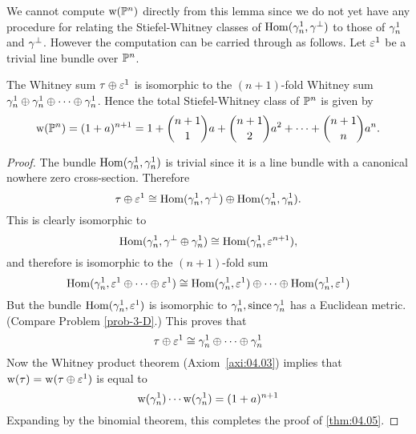 \documentclass[../main]{subfiles}
\begin{document}
We cannot compute $\operatorname{w}(\mathbb{P}^n)$ directly from this lemma since we do not yet have any procedure for relating the Stiefel-Whitney classes of $\operatorname{Hom}(\gamma_n^1, \gamma^{\perp})$ to those of $\gamma_n^1$ and $\gamma^{\perp}$. However the computation can be carried through as follows. Let $\varepsilon^1$ be a trivial line bundle over $\mathbb{P}^{n}$.

\begin{theorem}
\label{thm:04.05}
The Whitney sum $\tau \oplus \varepsilon^{1}$ is isomorphic to the $(n+1)$-fold Whitney sum $\gamma_{n}^{1} \oplus \gamma_{n}^{1} \oplus \cdots \oplus \gamma_{n}^{1}$. Hence the total Stiefel-Whitney class of $\mathbb{P}^{n}$ is given by
\[
\operatorname{w}(\mathbb{P}^{n})=(1+a)^{n+1}=1+\binom{n+1}{1}a + \binom{n+1}{2}a^2 + \dots + \binom{n+1}{n}a^{n} .
\]
\end{theorem}

\begin{proof}
The bundle $\operatorname{Hom}(\gamma_{n}^{1}, \gamma_{n}^{1})$  is trivial since it is a line bundle with a canonical nowhere zero cross-section. Therefore
\[
\tau \oplus \varepsilon^{1} \cong \operatorname{Hom}(\gamma_{n}^{1}, \gamma^{\perp}) \oplus \operatorname{Hom}(\gamma_{n}^{1}, \gamma_{n}^{1}) .
\]
This is clearly isomorphic to
\[
\operatorname{Hom}(\gamma_{n}^{1}, \gamma^{\perp} \oplus \gamma_{n}^{1}) \cong \operatorname{Hom}(\gamma_{n}^{1}, \varepsilon^{n+1}),
\]
and therefore is isomorphic to the $(n+1)$-fold sum
\[
\operatorname{Hom}(\gamma_{n}^{1}, \varepsilon^{1} \oplus \cdots \oplus \varepsilon^{1}) \cong \operatorname{Hom}(\gamma_{n}^{1}, \varepsilon^{1}) \oplus \cdots \oplus \operatorname{Hom}(\gamma_{n}^{1}, \varepsilon^{1})
\]
But the bundle $\operatorname{Hom}(\gamma_{n}^{1}, \varepsilon^{1})$ is isomorphic to $\gamma_{n}^{1}, \operatorname{since} \gamma_{n}^{1}$ has a Euclidean metric. (Compare Problem \ref{prob-3-D}.) This proves that
\[
\tau \oplus \varepsilon^{1} \cong \gamma_{n}^{1} \oplus \cdots \oplus \gamma_{n}^{1}
\]
Now the Whitney product theorem (Axiom~\ref{axi:04.03}) implies that $\operatorname{w}(\tau)=\operatorname{w}(\tau \oplus \varepsilon^{1})$ is equal to
\[
\operatorname{w}(\gamma_{n}^{1}) \cdots \operatorname{w}(\gamma_{n}^{1})=(1+a)^{n+1}
\]
Expanding by the binomial theorem, this completes the proof of \ref{thm:04.05}.

\end{proof}
\end{document}
